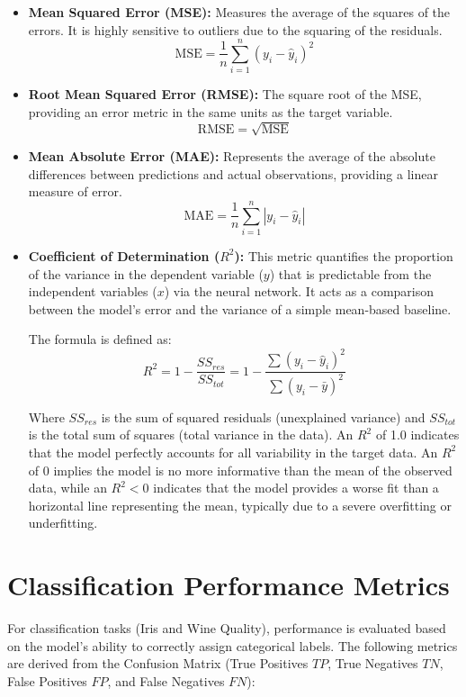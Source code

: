 \begin{itemize}
    \item \textbf{Mean Squared Error (MSE):} Measures the average of the squares of the errors. It is highly sensitive to outliers due to the squaring of the residuals.
    $$ \text{MSE} = \frac{1}{n} \sum_{i=1}^{n} (y_i - \hat{y}_i)^2 $$
    
    \item \textbf{Root Mean Squared Error (RMSE):} The square root of the MSE, providing an error metric in the same units as the target variable.
    $$ \text{RMSE} = \sqrt{\text{MSE}} $$

    \item \textbf{Mean Absolute Error (MAE):} Represents the average of the absolute differences between predictions and actual observations, providing a linear measure of error.
    $$ \text{MAE} = \frac{1}{n} \sum_{i=1}^{n} |y_i - \hat{y}_i| $$

    \item \textbf{Coefficient of Determination ($R^2$):} 
    This metric quantifies the proportion of the variance in the dependent variable ($y$) that is predictable from the independent variables ($x$) via the neural network. It acts as a comparison between the model's error and the variance of a simple mean-based baseline.
    
    The formula is defined as:
    \[ R^2 = 1 - \frac{SS_{res}}{SS_{tot}} = 1 - \frac{\sum (y_i - \hat{y}_i)^2}{\sum (y_i - \bar{y})^2} \]
    
    Where $SS_{res}$ is the sum of squared residuals (unexplained variance) and $SS_{tot}$ is the total sum of squares (total variance in the data). 
    An $R^2$ of 1.0 indicates that the model perfectly accounts for all variability in the target data. An $R^2$ of 0 implies the model is no more informative than the mean of the observed data, while an $R^2 < 0$ indicates that the  model provides a worse fit than a horizontal line representing the mean, typically due to a severe overfitting or underfitting.
\end{itemize}


\section{Classification Performance Metrics}
For classification tasks (Iris and Wine Quality), performance is evaluated based on the model's ability to correctly assign categorical labels. The following metrics are derived from the Confusion Matrix (True Positives $TP$, True Negatives $TN$, False Positives $FP$, and False Negatives $FN$):

